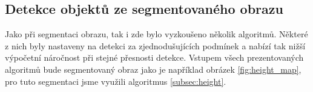 \documentclass[twoside]{ctuthesis}
\begin{document}
\subsection{Detekce objektů ze segmentovaného obrazu}
Jako při segmentaci obrazu, tak i zde bylo vyzkoušeno několik algoritmů. Některé z nich byly nastaveny na detekci za zjednodušujících podmínek a nabízí tak nižší výpočetní náročnost při stejné přesnosti detekce. Vstupem všech prezentovaných algoritmů bude segmentovaný obraz jako je například obrázek \ref{fig:height_map}, pro tuto segmentaci jsme využili algoritmus \ref{subsec:height}.





\end{document}
